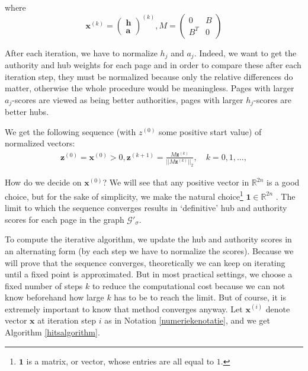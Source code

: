 \documentclass[a4paper,11pt]{report}
\newcommand{\R}{{\mathbb R}}
\newcommand{\graf}{\mathscr{G}}
\begin{document}
where 
$$\mathbf{x}^{(k)} = \begin{pmatrix} 
\mathbf{h}\\
\mathbf{a}
\end{pmatrix}^{(k)}, M =  \begin{pmatrix} 
0 & B\\
B^T & 0
\end{pmatrix}$$

After each iteration, we have to normalize $h_j$ and $a_j$. Indeed, we want to get the authority and hub weights for each page
and in order to compare these after each iteration step, they must be normalized because only the relative differences do matter, otherwise the whole procedure would be 
meaningless. Pages with larger $a_j$-scores are viewed as being better authorities, pages with larger $h_j$-scores are better hubs. 

We get the following sequence (with $z^{(0)}$ some positive start value) of normalized vectors: 
\begin{eqnarray}\label{sequencezk}
  \mathbf{z}^{(0)} = \mathbf{x}^{(0)} > 0, \mathbf{z}^{(k+1)} = \frac{M\mathbf{z}^{(k)}}{||M\mathbf{z}^{(k)}||_2}, \quad k = 
  0,1,\ldots,
\end{eqnarray}

How do we decide on $\mathbf{x}^{(0)}$? We will see that any positive vector in $\R^{2n}$ is a good choice, but for the sake of simplicity, we make the natural choice\footnote{$\mathbf{1}$ is a matrix, or vector, whose entries are all equal to 
$1$.} $\mathbf{1} \in \R^{2n}$ . The limit to which the sequence converges 
results in `definitive' hub and authority scores for each page in the graph $\graf'_\sigma$. 

To compute the iterative algorithm, we update the hub and authority scores in an alternating form (by each step we have to normalize the scores). 
Because we will prove that the sequence converges, theoretically we can keep on iterating until a fixed point is approximated. But in most practical settings, 
we choose a fixed number of steps $k$ to reduce the computational cost because we can not know beforehand how
large $k$ has to be to reach the limit. But of course, it is extremely important to know that method converges anyway. Let $\mathbf{x}^{(i)}$ denote vector $\mathbf{x}$ at iteration step $i$ as in Notation \ref{numeriekenotatie}, and we get Algorithm 
\ref{hitsalgorithm}.
\end{document}
